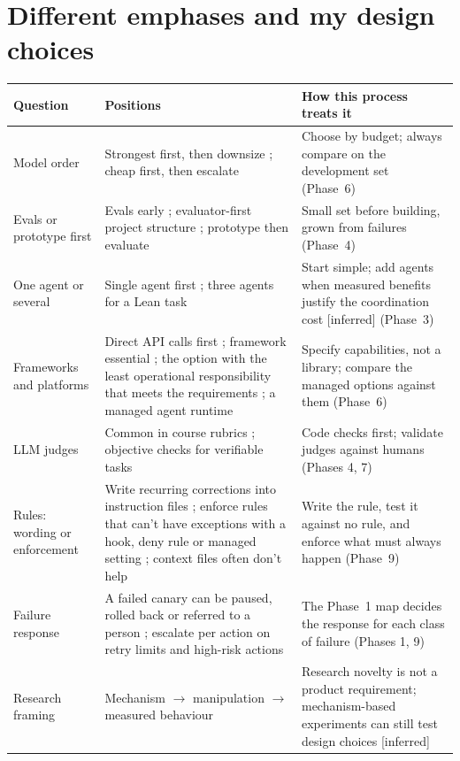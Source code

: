 \documentclass[10pt]{article}
\newcommand{\inferred}{\textsf{\small[inferred]}}
\begin{document}
\section*{Different emphases and my design choices}

\begin{center}
\small
\begin{tabularx}{\linewidth}{@{}p{2.8cm} L L@{}}
\toprule
Question & Positions & How this process treats it \\
\midrule
Model order & Strongest first, then downsize \cite{openai}; cheap first, then escalate \cite{mannheim,cs329a} & Choose by budget; always compare on the development set (Phase~6) \\
Evals or prototype first & Evals early \cite{anthevals}; evaluator-first project structure \cite[Grading, Project Timeline]{brkcourse}; prototype then evaluate \cite{anthtools} & Small set before building, grown from failures (Phase~4) \\
One agent or several & Single agent first \cite[p.~16]{openai}; three agents for a Lean task \cite{brkadv} & Start simple; add agents when measured benefits justify the coordination cost \inferred{} (Phase~3) \\
Frameworks and platforms & Direct API calls first \cite{bea}; framework essential \cite{gintro}; the option with the least operational responsibility that meets the requirements \cite[\S3]{mscafstrat}; a managed agent runtime \cite[``Choose an agent runtime'']{gcloudarch} & Specify capabilities, not a library; compare the managed options against them (Phase~6) \\
LLM judges & Common in course rubrics \cite{cs329t}; objective checks for verifiable tasks \cite{brkeval} & Code checks first; validate judges against humans (Phases 4, 7) \\
Rules: wording or enforcement & Write recurring corrections into instruction files \cite[``When to add to CLAUDE.md'']{ccmemory}; enforce rules that can't have exceptions with a hook, deny rule or managed setting \cite[``Enforce the rules that can't have exceptions'']{ccbest}; context files often don't help \cite[Abstract]{gloaguen} & Write the rule, test it against no rule, and enforce what must always happen (Phase~9) \\
Failure response & A failed canary can be paused, rolled back or referred to a person \cite[ch.~16]{srecanary}; escalate per action on retry limits and high-risk actions \cite[p.~31]{openai} & The Phase~1 map decides the response for each class of failure (Phases 1, 9) \\
Research framing & Mechanism $\rightarrow$ manipulation $\rightarrow$ measured behaviour \cite{neuresearch} & Research novelty is not a product requirement; mechanism-based experiments can still test design choices \inferred \\
\bottomrule
\end{tabularx}
\end{center}
\end{document}
